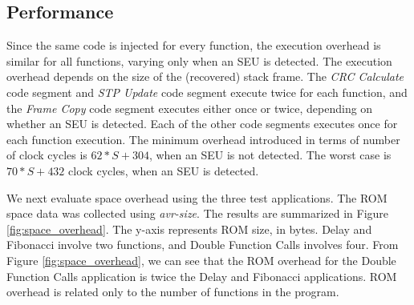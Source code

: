 \subsection{Performance}
\vspace{-15pt}
Since the same code is injected for every function, the execution overhead is similar for all functions, varying only when an SEU is detected. The execution overhead depends on the size of the (recovered) stack frame. The \textit{CRC Calculate} code segment and \textit{STP Update} code segment execute twice for each function, and the \textit{Frame Copy} code segment executes either once or twice, depending on whether an SEU is detected. Each of the other code segments executes once for each function execution. The minimum overhead introduced in terms of number of clock cycles is $62*S+304$, when an SEU is not detected. The worst case is $70*S+432$ clock cycles, when an SEU is detected. 

We next evaluate space overhead using the three test applications. The ROM space data was collected using \textit{avr-size}. The results are summarized in Figure \ref{fig:space_overhead}. The y-axis represents ROM size, in bytes. Delay and Fibonacci involve two functions, and Double Function Calls involves four. From Figure \ref{fig:space_overhead}, we can see that the ROM overhead for the Double Function Calls application is twice the Delay and Fibonacci applications. ROM overhead is related only to the number of functions in the program.
\vspace{-15pt}
